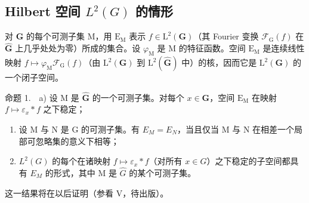 \subsection{\texorpdfstring{Hilbert 空间 \(L^{2}(G)\) 的情形}{Hilbert 空间 L\^{}\{2\}(G) 的情形}}

对 \(\widehat{\mathbf{G}}\) 的每个可测子集 M，用 \(\mathrm{E_M}\) 表示 \(f \in \mathrm{L}^2(\mathbf{G})\)（其 Fourier 变换 \(\mathcal{F}_{\mathrm{G}}(f)\) 在 \(\widehat{\mathbf{G}}\) 上几乎处处为零）所成的集合。设 \(\varphi_{\mathrm{M}}\) 是 M 的特征函数。空间 \(\mathrm{E_M}\) 是连续线性映射 \(f \mapsto \varphi_{\mathrm{M}}\mathcal{F}_{\mathrm{G}}(f)\)（由 \(\mathrm{L}^2(\mathbf{G})\) 到 \(\mathrm{L}^2(\widehat{\mathbf{G}})\) 中）的核，因而它是 \(\mathrm{L}^2(\mathbf{G})\) 的一个闭子空间。

命题 1.　a) 设 M 是 \(\widehat{\mathbf{G}}\) 的一个可测子集。对每个 \(x \in \mathbf{G}\)，空间 \(\mathrm{E}_{\mathrm{M}}\) 在映射 \(f \mapsto \varepsilon_x * f\) 之下稳定；

\begin{enumerate}
\def\labelenumi{\alph{enumi})}
\setcounter{enumi}{1}
\item
  设 M 与 N 是 G 的可测子集。有 \(E_{M} = E_{N}\)，当且仅当 M 与 N 在相差一个局部可忽略集的意义下相等；
\item
  \(L^{2}(G)\) 的每个在诸映射 \(f \mapsto \varepsilon_{x} * f\)（对所有 \(x \in G\)）之下稳定的子空间都具有 \(E_{M}\) 的形式，其中 M 是 \(\widehat{G}\) 的某个可测子集。
\end{enumerate}

这一结果将在以后证明（参看 V，待出版）。
\relax{}
